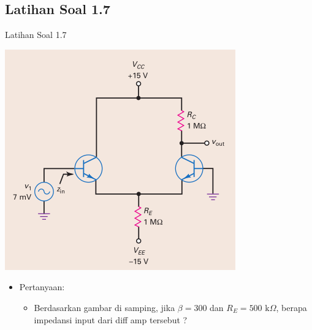 \documentclass[aspectratio=169]{beamer}
\begin{document}
\subsection{Latihan Soal 1.7}
\begin{frame}{Latihan Soal 1.7}
	\begin{multicols}{2}
		\begin{center}
			\includegraphics[height=0.7\textheight]{gambar/01.contoh_soal_07}
		\end{center}
		\columnbreak
		\begin{itemize}
			\item Pertanyaan:
			\begin{itemize}
				\item Berdasarkan gambar di samping, jika $ \beta = 300 $ dan $ R_E = 500 \text{ k}\Omega $, berapa impedansi input dari diff amp tersebut ?
			\end{itemize}
		\end{itemize}
	\end{multicols}
\end{frame}
\end{document}
